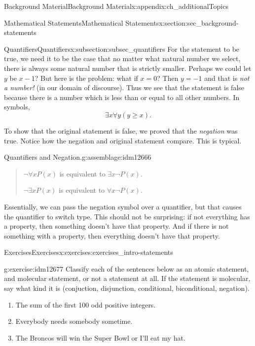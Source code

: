 \documentclass[oneside,10pt,]{book}
\numberwithin{equation}{chapter}
\begin{document}
\begin{appendixptx}{Background Material}{}{Background Material}{}{}{x:appendix:ch_additionalTopics}
\begin{sectionptx}{Mathematical Statements}{}{Mathematical Statements}{}{}{x:section:sec_background-statements}
\begin{subsectionptx}{Quantifiers}{}{Quantifiers}{}{}{x:subsection:subsec_quantifiers}
For the statement to be true, we need it to be the case that no matter what natural number we select, there is always some natural number that is strictly smaller. Perhaps we could let \(y\) be \(x-1\)? But here is the problem: what if \(x = 0\)? Then \(y = -1\) and that is \emph{not a number!} (in our domain of discourse). Thus we see that the statement is false because there is a number which is less than or equal to all other numbers. In symbols,%
\begin{equation*}
\exists x \forall y (y \ge x).
\end{equation*}
%
\par
To show that the original statement is false, we proved that the \emph{negation} was true. Notice how the negation and original statement compare. This is typical.%
\begin{assemblage}{Quantifiers and Negation.}{g:assemblage:idm12666}%
\begin{quote}%
\(\neg \forall x P(x)\) is equivalent to \(\exists x \neg P(x)\).%
\par
\(\neg \exists x P(x)\) is equivalent to \(\forall x \neg P(x)\).%
\end{quote}
\end{assemblage}
Essentially, we can pass the negation symbol over a quantifier, but that causes the quantifier to switch type. This should not be surprising: if not everything has a property, then something doesn't have that property. And if there is not something with a property, then everything doesn't have that property.%
\end{subsectionptx}
%
%
\typeout{************************************************}
\typeout{************************************************}
%
\begin{exercises-subsection}{Exercises}{}{Exercises}{}{}{x:exercises:exercises_intro-statements}
\begin{divisionexercise}{1}{}{}{g:exercise:idm12677}%
Classify each of the sentences below as an atomic statement, and molecular statement, or not a statement at all.  If the statement is molecular, say what kind it is (conjuction, disjunction, conditional, biconditional, negation).%
\begin{enumerate}[label=(\alph*)]
\item{}The sum of the first 100 odd positive integers.%
\item{}Everybody needs somebody sometime.%
\item{}The Broncos will win the Super Bowl or I'll eat my hat.%

\end{enumerate}
\end{divisionexercise}
\end{exercises-subsection}
\end{sectionptx}
\end{appendixptx}
\end{document}
